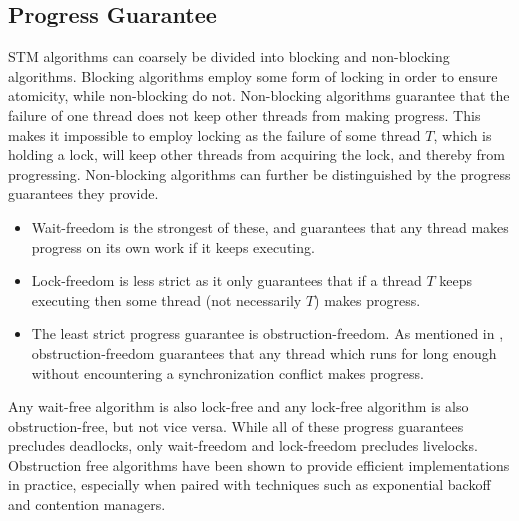 \subsection{Progress Guarantee}
\ac{STM} algorithms can coarsely be divided into blocking and non-blocking algorithms\cite[p. 47]{harris2010transactional}. Blocking algorithms employ some form of locking in order to ensure atomicity, while non-blocking do not\cite[p. 59]{herlihy2012art}. Non-blocking algorithms guarantee that the failure of one thread does not keep other threads from making progress\cite[p. 47]{harris2010transactional}\cite[p. 142]{herlihy1991wait}\cite[p. 59]{herlihy2012art}. This  makes it impossible to employ locking as the failure of some thread $T$, which is holding a lock, will keep other threads from acquiring the lock, and thereby from progressing. Non-blocking algorithms can further be distinguished by the progress guarantees they provide. 
\begin{itemize}
	\item Wait-freedom is the strongest of these, and guarantees that any thread makes progress on its own work if it keeps executing\cite[p. 124]{herlihy1991wait}\cite[p. 59]{herlihy2012art}. 
	\item Lock-freedom is less strict as it only guarantees that if a thread $T$ keeps executing then some thread (not necessarily $T$) makes progress\cite[p. 47]{harris2010transactional}\cite[p. 60]{herlihy2012art}. 
	\item The least strict progress guarantee is obstruction-freedom\cite[p. 47]{harris2010transactional}\cite{herlihy2003obstruction}\cite[p. 61]{herlihy2012art}. As mentioned in , obstruction-freedom guarantees that any thread which runs for long enough without encountering a synchronization conflict makes progress\cite[p. 1]{herlihy2003obstruction}. 
\end{itemize}
Any wait-free algorithm is also lock-free and any lock-free algorithm is also obstruction-free, but not vice versa\cite[p. 60]{herlihy2012art}. While all of these progress guarantees precludes deadlocks, only wait-freedom and lock-freedom precludes livelocks\cite[p. 47]{harris2010transactional}. Obstruction free algorithms have been shown to provide efficient implementations in practice\cite[p. 61]{herlihy2012art}, especially when paired with techniques such as exponential backoff\cite[p. 147]{herlihy2012art} and contention managers\cite[p. 51]{harris2010transactional}.


